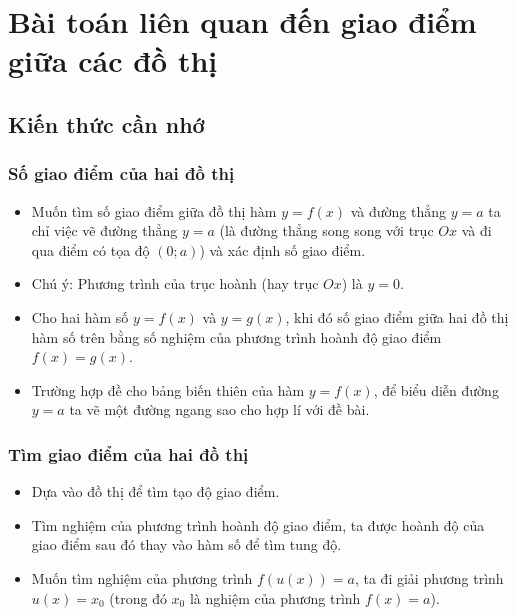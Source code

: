 \setcounter{ex}{0}
\section{Bài toán liên quan đến giao điểm giữa các đồ thị}
\subsection{Kiến thức cần nhớ}
\begin{khung}
	\subsubsection{Số giao điểm của hai đồ thị}
	\begin{itemize}
		\item Muốn tìm số giao điểm giữa đồ thị hàm $y=f(x)$ và đường thẳng $y=a$ ta chỉ việc vẽ đường thẳng $y=a$ (là đường thẳng song song với trục $Ox$ và đi qua điểm có tọa độ $(0;a)$) và xác định số giao điểm.
		\item  Chú ý: Phương trình của trục hoành (hay trục $Ox$) là $y=0$.
		\item Cho hai hàm số $y=f(x)$ và $y=g(x)$, khi đó số giao điểm giữa hai đồ thị hàm số trên bằng số nghiệm của phương trình hoành độ giao điểm $f(x)=g(x)$.
		\item Trường hợp đề cho bảng biến thiên của hàm $y=f(x)$, để biểu diễn đường $y=a$ ta vẽ một đường ngang sao cho hợp lí với đề bài.
			\end{itemize}
			\subsubsection{Tìm giao điểm của hai đồ thị}
			\begin{itemize}
				\item Dựa vào đồ thị để tìm tạo độ giao điểm.\item Tìm nghiệm của phương trình hoành độ giao điểm, ta được hoành độ của giao điểm sau đó thay vào hàm số để tìm tung độ. \item Muốn tìm nghiệm của phương trình $f(u(x))=a$, ta đi giải phương trình $u(x)=x_0$ (trong đó $x_0$ là nghiệm của phương trình $f(x)=a$).
			\end{itemize}
\end{khung}

